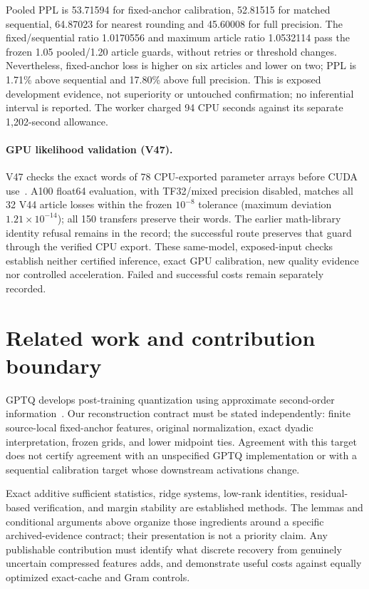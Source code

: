 \documentclass[10pt,twocolumn,letterpaper]{article}
\begin{document}
Pooled PPL is 53.71594 for fixed-anchor calibration, 52.81515 for matched
sequential, 64.87023 for nearest rounding and 45.60008 for full precision.
The fixed/sequential ratio 1.0170556 and maximum article ratio 1.0532114 pass
the frozen 1.05 pooled/1.20 article guards, without retries or threshold changes.
Nevertheless, fixed-anchor loss is higher on six articles and lower on two;
PPL is 1.71\% above sequential and 17.80\% above full precision. This is exposed
development evidence, not superiority or untouched confirmation; no inferential
interval is reported. The worker charged 94 CPU seconds against its separate
1,202-second allowance.

\paragraph{GPU likelihood validation (V47).}
V47 checks the exact words of 78 CPU-exported parameter arrays before CUDA
use~\cite{v47}. A100 float64 evaluation, with TF32/mixed precision disabled,
matches all 32 V44 article losses within the frozen $10^{-8}$ tolerance
(maximum deviation $1.21\times10^{-14}$); all 150 transfers preserve their words.
The earlier math-library identity refusal remains in the record; the successful
route preserves that guard through the verified CPU export. These same-model,
exposed-input checks establish neither certified inference, exact GPU calibration,
new quality evidence nor controlled acceleration. Failed and successful costs
remain separately recorded.

\section{Related work and contribution boundary}
GPTQ develops post-training quantization using approximate second-order
information~\cite{gptq}. Our reconstruction contract must be stated independently:
finite source-local fixed-anchor features, original normalization, exact dyadic
interpretation, frozen grids, and lower midpoint ties. Agreement with this target
does not certify agreement with an unspecified GPTQ implementation or with a
sequential calibration target whose downstream activations change.

Exact additive sufficient statistics, ridge systems, low-rank identities,
residual-based verification, and margin stability are established methods. The
lemmas and conditional arguments above organize those ingredients around a
specific archived-evidence contract; their presentation is not a priority claim.
Any publishable contribution must identify what discrete recovery from genuinely
uncertain compressed features adds, and demonstrate useful costs against equally
optimized exact-cache and Gram controls.
\end{document}
